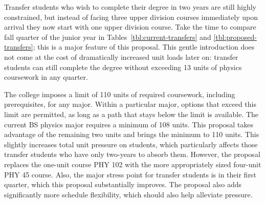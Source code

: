 \documentclass[12pt]{article}
\begin{document}
Transfer students who wish to complete their degree in two years are
still highly constrained, but instead of facing three upper division
courses immediately upon arrival they now start with one upper
division course.  Take the time to compare fall quarter of the junior
year in Tables~\ref{tbl:current-transfers} and
\ref{tbl:proposed-transfers}; this is a major feature of this
proposal.  This gentle introduction does not come at the cost of
dramatically increased unit loads later on: transfer students can
still complete the degree without exceeding 13 units of physics
coursework in any quarter.

The college imposes a limit of 110 units of required coursework,
including prerequisites, for any major.  Within a particular major,
options that exceed this limit are permitted, as long as a path that
stays below the limit is available.  The current BS physics major
requires a minimum of 108 units.  This proposal takes advantage of the
remaining two units and brings the minimum to 110 units.  This
slightly increases total unit pressure on students, which particularly
affects those transfer students who have only two-years to absorb
them.  However, the proposal replaces the one-unit course PHY 102 with
the more appropriately sized four-unit PHY 45 course.  Also, the major
stress point for transfer students is in their first quarter, which
this proposal substantially improves.  The proposal also adds
significantly more schedule flexibility, which should also help
alleviate pressure.
\end{document}
